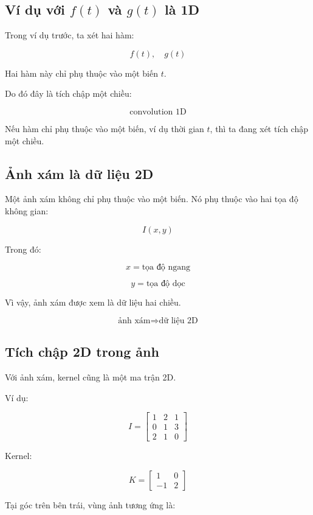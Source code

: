 \subsection{Ví dụ với $f(t)$ và $g(t)$ là 1D}

Trong ví dụ trước, ta xét hai hàm:

\[
    f(t), \quad g(t)
\]

Hai hàm này chỉ phụ thuộc vào một biến $t$.

Do đó đây là tích chập một chiều:

\[
    \text{convolution 1D}
\]

\begin{ghinho}
Nếu hàm chỉ phụ thuộc vào một biến, ví dụ thời gian $t$, thì ta đang xét tích chập một chiều.
\end{ghinho}

\subsection{Ảnh xám là dữ liệu 2D}

Một ảnh xám không chỉ phụ thuộc vào một biến. Nó phụ thuộc vào hai tọa độ không gian:

\[
    I(x,y)
\]

Trong đó:

\[
    x = \text{tọa độ ngang}
\]

\[
    y = \text{tọa độ dọc}
\]

Vì vậy, ảnh xám được xem là dữ liệu hai chiều.

\[
    \text{ảnh xám}
    \Rightarrow
    \text{dữ liệu 2D}
\]

\subsection{Tích chập 2D trong ảnh}

Với ảnh xám, kernel cũng là một ma trận 2D.

Ví dụ:

\[
I=
\begin{bmatrix}
1 & 2 & 1\\
0 & 1 & 3\\
2 & 1 & 0
\end{bmatrix}
\]

Kernel:

\[
K=
\begin{bmatrix}
1 & 0\\
-1 & 2
\end{bmatrix}
\]

Tại góc trên bên trái, vùng ảnh tương ứng là:

